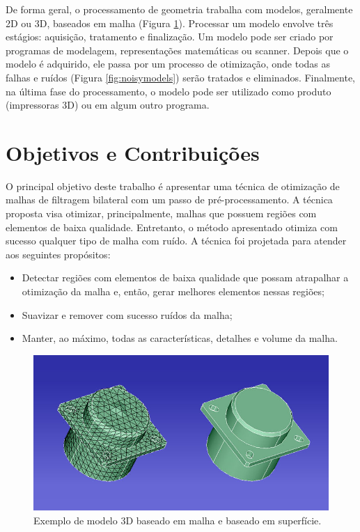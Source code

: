 De forma geral, o processamento de geometria trabalha com modelos, geralmente 2D ou 3D, baseados em malha (Figura \ref{fig:mshvsnonmsh}). Processar um modelo envolve três estágios: aquisição, tratamento e finalização. Um modelo pode ser criado por programas de modelagem, representações matemáticas ou scanner. Depois que o modelo é adquirido, ele passa por um processo de otimização, onde todas as falhas e ruídos (Figura \ref{fig:noisymodels}) serão tratados e eliminados. Finalmente, na última fase do processamento, o modelo pode ser utilizado como produto (impressoras 3D) ou em algum outro programa.

\section{Objetivos e Contribuições}

O principal objetivo deste trabalho é apresentar uma técnica de otimização de malhas de filtragem bilateral com um passo de pré-processamento. A técnica proposta visa otimizar, principalmente, malhas que possuem regiões com elementos de baixa qualidade. Entretanto, o método apresentado otimiza com sucesso qualquer tipo de malha com ruído. A técnica foi projetada para atender aos seguintes propósitos:

\begin{itemize}  
\item Detectar regiões com elementos de baixa qualidade que possam atrapalhar a otimização da malha e, então, gerar melhores elementos nessas regiões;
\item Suavizar e remover com sucesso ruídos da malha;
\item Manter, ao máximo, todas as características, detalhes e volume da malha.
\end{itemize}


\begin{figure}[!t]
\captionsetup{width=16cm}
\centering
\includegraphics[scale=0.55]{figuras/meshvsnonmesh.jpg}
\caption{Exemplo de modelo 3D baseado em malha e baseado em superfície.}
\label{fig:mshvsnonmsh}
\end{figure}



